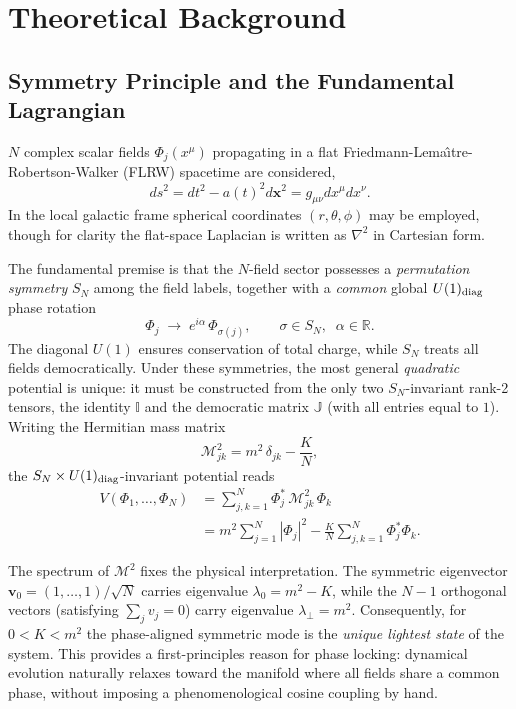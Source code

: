 \section{Theoretical Background}
\label{sec:theory}

\subsection{Symmetry Principle and the Fundamental Lagrangian}
\label{subsec:lagrangian}

$N$ complex scalar fields $\Phi_j(x^\mu)$ propagating in a flat Friedmann-Lema\^{\i}tre-Robertson-Walker (FLRW) spacetime are considered,
\begin{equation}
ds^2 = dt^2 - a(t)^2 d\mathbf{x}^2 = g_{\mu\nu}dx^\mu dx^\nu .
\end{equation}
In the local galactic frame spherical coordinates $(r,\theta,\phi)$ may be employed, though for clarity the flat-space Laplacian is written as $\nabla^2$ in Cartesian form.

The fundamental premise is that the $N$-field sector possesses a \emph{permutation symmetry} $S_N$ among the field labels, together with a \emph{common} global $U(1)_{\rm diag}$ phase rotation
\begin{equation}
\Phi_j \;\longrightarrow\; e^{i\alpha}\,\Phi_{\sigma(j)}, \qquad \sigma\in S_N,\;\; \alpha\in\mathbb{R}.
\end{equation}
The diagonal $U(1)$ ensures conservation of total charge, while $S_N$ treats all fields democratically. Under these symmetries, the most general \emph{quadratic} potential is unique: it must be constructed from the only two $S_N$-invariant rank-2 tensors, the identity $\mathbb{I}$ and the democratic matrix $\mathbb{J}$ (with all entries equal to $1$). Writing the Hermitian mass matrix
\begin{equation}
\mathcal{M}^2_{jk} = m^2\,\delta_{jk} - \frac{K}{N},
\end{equation}
the $S_N\times U(1)_{\rm diag}$-invariant potential reads
\begin{equation}
\begin{aligned}
V(\Phi_1,\dots,\Phi_N)
&= \sum_{j,k=1}^N \Phi_j^*\,\mathcal{M}^2_{jk}\,\Phi_k \\
&= m^2\sum_{j=1}^N |\Phi_j|^2 - \frac{K}{N}\sum_{j,k=1}^N \Phi_j^*\Phi_k .
\end{aligned}
\end{equation}

The spectrum of $\mathcal{M}^2$ fixes the physical interpretation. The symmetric eigenvector $\mathbf{v}_0=(1,\dots,1)/\sqrt{N}$ carries eigenvalue $\lambda_0=m^2-K$, while the $N-1$ orthogonal vectors (satisfying $\sum_j v_j=0$) carry eigenvalue $\lambda_\perp=m^2$. Consequently, for $0<K<m^2$ the phase-aligned symmetric mode is the \emph{unique lightest state} of the system. This provides a first-principles reason for phase locking: dynamical evolution naturally relaxes toward the manifold where all fields share a common phase, without imposing a phenomenological cosine coupling by hand.

